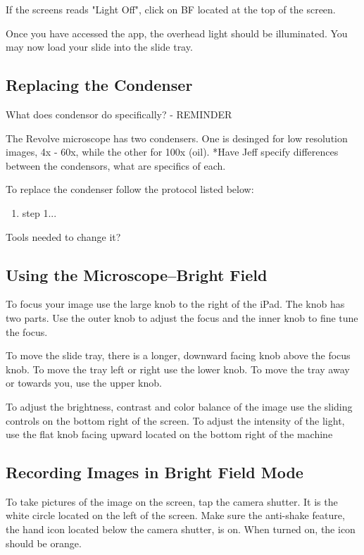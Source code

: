 \documentclass[12pt]{../SOP2}
\begin{document}
\NP If the screens reads "Light Off", click on BF located at the top of the screen.

\NP Once you have accessed the app, the overhead light should be illuminated. You may now load your slide into the slide tray.
 
 
\subsection*{Replacing the Condenser}

\NP What does condensor do specifically? - REMINDER

\NP The Revolve microscope has two condensers. One is desinged for low resolution images, 4x - 60x, while the other for 100x (oil). 
*Have Jeff specify differences between the condensors, what are specifics of each.

\NP To replace the condenser follow the protocol listed below: 

\begin{enumerate}
  \item step 1...
\end{enumerate}

Tools needed to change it?
  
\subsection*{Using the Microscope--Bright Field} 

\NP To focus your image use the large knob to the right of the iPad. The knob has two parts. Use the outer knob to adjust the focus and the inner knob to fine tune the focus.

\NP To move the slide tray, there is a longer, downward facing knob above the focus knob. To move the tray left or right use the lower knob. To move the tray away or towards you, use the upper knob.

\NP To adjust the brightness, contrast and color balance of the image use the sliding controls on the bottom right of the screen. To adjust the intensity of the light, use the flat knob facing upward located on the bottom right of the machine
  

\subsection*{Recording Images in Bright Field Mode}

\NP To take pictures of the image on the screen, tap the camera shutter. It is the white circle located on the left of the screen. Make sure the anti-shake feature, the hand icon located below the camera shutter, is on. When turned on, the icon should be orange.
\end{document}
